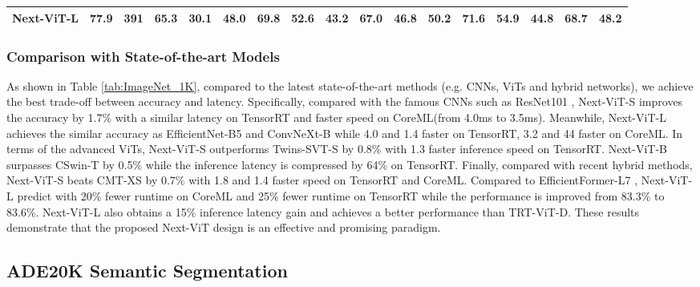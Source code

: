 \documentclass[10pt,twocolumn,letterpaper]{article}
\begin{document}
\begin{table*}[]
{\begin{tabular}{c|cc|cc|cccccc|cccccc}
    \textbf{Next-ViT-L}                   &\textbf{77.9}   &\textbf{391}  &\textbf{65.3}   &\textbf{30.1}   &\textbf{48.0}   &\textbf{69.8}   &\textbf{52.6}   &\textbf{43.2}   &\textbf{67.0}   &\textbf{46.8}   &\textbf{50.2}   &\textbf{71.6}   &\textbf{54.9}   &\textbf{44.8}   &\textbf{68.7}   &\textbf{48.2}         \\

    \bottomrule
    \end{tabular}
    }

    \label{tab:MaskRCNN_COCO}
  \end{table*}



\subsubsection{Comparison with State-of-the-art Models} 
 As shown in Table \ref{tab:ImageNet_1K}, compared to the latest state-of-the-art methods (e.g. CNNs, ViTs and hybrid networks), we achieve the best trade-off between accuracy and latency.
Specifically, compared with the famous CNNs such as ResNet101 \cite{ResNet}, Next-ViT-S improves the accuracy by 1.7\% with a similar latency on TensorRT and faster speed on CoreML(from 4.0ms to 3.5ms). Meanwhile, Next-ViT-L achieves the similar accuracy as EfficientNet-B5 \cite{EfficientNet} and ConvNeXt-B while 4.0 and 
 1.4 faster on TensorRT, 3.2 and 44 faster on CoreML.
 In terms of the advanced ViTs, Next-ViT-S outperforms Twins-SVT-S \cite{Twins} by 0.8\% with 1.3 faster inference speed on TensorRT. Next-ViT-B surpasses CSwin-T\cite{CSWin} by 0.5\% while the inference latency is compressed by 64\% on TensorRT.
 Finally, compared with recent hybrid methods, Next-ViT-S beats CMT-XS by 0.7\% with 1.8 and 1.4 faster speed on TensorRT and CoreML. Compared to EfficientFormer-L7 \cite{li2022efficientformer}, Next-ViT-L predict with 20\% fewer runtime on CoreML and 25\% fewer runtime on TensorRT while the performance is improved from 83.3\% to 83.6\%. Next-ViT-L also obtains a 15\% inference latency gain and achieves a better performance than TRT-ViT-D.
 These results demonstrate that the proposed Next-ViT design is an effective and promising paradigm.
	


\subsection{ADE20K Semantic Segmentation}
\end{document}
